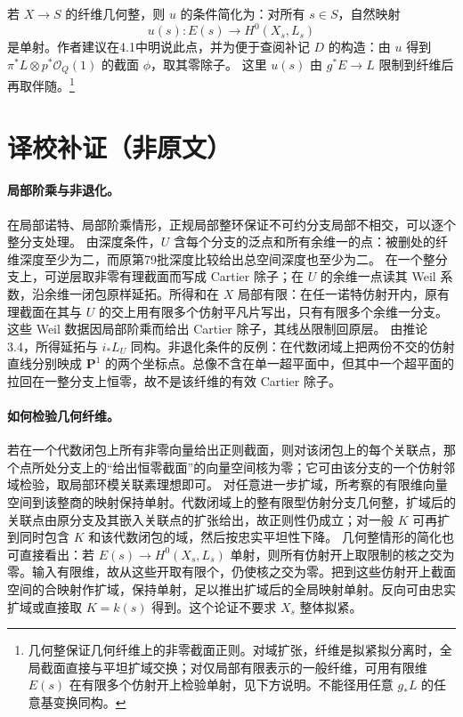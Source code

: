 \documentclass[openany,fontset=fandol]{ctexbook}
\newcommand{\OO}{\mathcal O}
\begin{document}
若 \(X\to S\) 的纤维几何整，则 \(u\) 的条件简化为：对所有 \(s\in S\)，自然映射
\[
 u(s):E(s)\longrightarrow H^0(X_s,L_s)
\]
是单射。作者建议在4.1中明说此点，并为便于查阅补记 \(D\) 的构造：由 \(u\) 得到
\(\pi^*L\otimes p^*\OO_Q(1)\) 的截面 \(\phi\)，取其零除子。
这里 \(u(s)\) 由 \(g^*E\to L\) 限制到纤维后再取伴随。\footnote{几何整保证几何纤维上的非零截面正则。对域扩张，纤维是拟紧拟分离时，全局截面直接与平坦扩域交换；对仅局部有限表示的一般纤维，可用有限维 \(E(s)\) 在有限多个仿射开上检验单射，见下方说明。不能径用任意 \(g_*L\) 的任意基变换同构。}

\section*{译校补证（非原文）}
\paragraph{局部阶乘与非退化。}
在局部诺特、局部阶乘情形，正规局部整环保证不可约分支局部不相交，可以逐个整分支处理。
由深度条件，\(U\) 含每个分支的泛点和所有余维一的点：被删处的纤维深度至少为二，而原第79批深度比较给出总空间深度也至少为二。
在一个整分支上，可逆层取非零有理截面而写成 Cartier 除子；在 \(U\) 的余维一点读其 Weil 系数，沿余维一闭包原样延拓。所得和在 \(X\) 局部有限：在任一诺特仿射开内，原有理截面在其与 \(U\) 的交上用有限多个仿射平凡片写出，只有有限多个余维一分支。这些 Weil 数据因局部阶乘而给出 Cartier 除子，其线丛限制回原层。
由推论3.4，所得延拓与 \(i_*L_U\) 同构。非退化条件的反例：在代数闭域上把两份不交的仿射直线分别映成 \(\mathbf P^1\) 的两个坐标点。总像不含在单一超平面中，但其中一个超平面的拉回在一整分支上恒零，故不是该纤维的有效 Cartier 除子。

\paragraph{如何检验几何纤维。}
若在一个代数闭包上所有非零向量给出正则截面，则对该闭包上的每个关联点，那个点所处分支上的“给出恒零截面”的向量空间核为零；它可由该分支的一个仿射邻域检验，取局部环模关联素理想即可。
对任意进一步扩域，所考察的有限维向量空间到该整商的映射保持单射。代数闭域上的整有限型仿射分支几何整，扩域后的关联点由原分支及其嵌入关联点的扩张给出，故正则性仍成立；对一般 \(K\) 可再扩到同时包含 \(K\) 和该代数闭包的域，然后按忠实平坦性下降。
几何整情形的简化也可直接看出：若 \(E(s)\to H^0(X_s,L_s)\) 单射，则所有仿射开上取限制的核之交为零。输入有限维，故从这些开取有限个，仍使核之交为零。把到这些仿射开上截面空间的合映射作扩域，保持单射，足以推出扩域后的全局映射单射。反向可由忠实扩域或直接取 \(K=k(s)\) 得到。这个论证不要求 \(X_s\) 整体拟紧。
\end{document}
